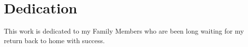 {}
\chapter*{Dedication}%

This work is dedicated to my Family Members who are been long waiting for my
return back to home with success.
\newpage